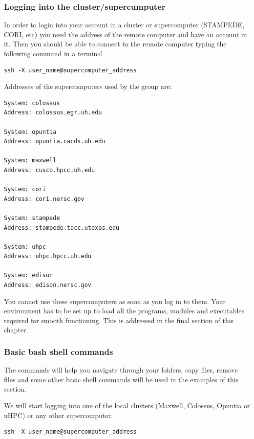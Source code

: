 \documentclass[11pt]{article}
\begin{document}
\subsubsection{Logging into the cluster/supercumputer}
\label{sec-2-1-2}
In order to login into your account in a cluster or supercomputer (STAMPEDE, CORI, etc) you need the address of the remote computer and have an account in it. Then you should be able to connect to the remote computer typing the following command in a terminal
\begin{verbatim}
ssh -X user_name@supercomputer_address
\end{verbatim}

Addresses of the supercomputers used by the group are:
\begin{verbatim}
System: colossus
Address: colossus.egr.uh.edu

System: opuntia
Address: opuntia.cacds.uh.edu

System: maxwell 
Address: cusco.hpcc.uh.edu

System: cori
Address: cori.nersc.gov

System: stampede
Address: stampede.tacc.utexas.edu

System: uhpc
Address: uhpc.hpcc.uh.edu

System: edison
Address: edison.nersc.gov
\end{verbatim}

You cannot use these supercomputers as soon as you log in to them. Your environment has to be set up to load all the programs, modules and executables required for smooth functioning. This is addressed in the final section of this chapter. 

\subsubsection{Basic bash shell commands}
\label{sec-2-1-3}
The commands will help you navigate through your folders, copy files, remove files and some other basic shell commands will be used in the examples of this section. 

We will start logging into one of the local clusters (Maxwell, Colossus, Opuntia or uHPC) or any other supercomputer.
\begin{verbatim}
ssh -X user_name@supercomputer_address
\end{verbatim}
\end{document}
